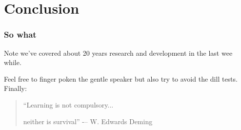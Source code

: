 \documentclass[a4paper,handout]{beamer}
\begin{document}
\section{Conclusion}
\begin{frame}\frametitle{So what}
Note we've covered about 20 years research and development in
the last wee while.\pause

Feel free to finger poken the gentle speaker but also try to avoid the
dill tests.  \vfill \pause Finally:
\begin{quote}
“Learning is not compulsory...

\pause
neither is survival” -– W. Edwards Deming
\end{quote}
\end{frame}
\end{document}
